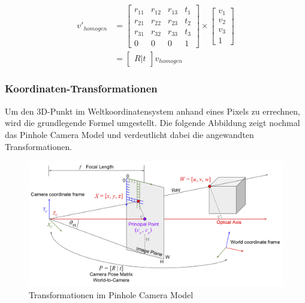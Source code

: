 	\begin{equation}
	\begin{aligned}
	v'_{homogen} &= \begin{bmatrix}
	r_{11} & r_{12} & r_{13} & t_1 \\
	r_{21} & r_{22} & r_{23} & t_2 \\
	r_{31} & r_{32} & r_{33} & t_3 \\
	0 & 0 & 0 & 1
	\end{bmatrix} \times \begin{bmatrix}
	v_1 \\
	v_2 \\
	v_3 \\
	1
	\end{bmatrix} \\
	&= \begin{bmatrix}
	R|t
	\end{bmatrix} v_{homogen}
	\end{aligned}
	\label{eq:rot_trans_homgen}
	\end{equation}
	
	\newpage
	
	\subsubsection{Koordinaten-Transformationen}
	Um den 3D-Punkt im Weltkoordinatensystem anhand eines Pixels zu errechnen, wird die grundlegende Formel umgestellt. Die folgende Abbildung zeigt nochmal das Pinhole Camera Model und verdeutlicht dabei die angewandten Transformationen.
	
	\begin{figure}[h]
		\centering
		\includegraphics[width=0.9\linewidth]{img/grundlagen/pinhole_camera_model_2.png}
		\caption[Transformationen]{Transformationen im Pinhole Camera Model}
		\label{fig:pinhole-camera-model_transformations}
	\end{figure}
	
